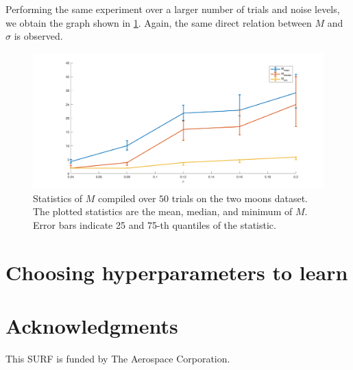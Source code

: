 \documentclass{siamart1116}
\begin{document}
        Performing the same experiment over a larger number of trials and noise levels, we obtain the graph shown in \cref{taM_M_moons_3}. Again, the same direct relation between $M$ and $\sigma$ is observed.

        \begin{figure}[!htb]
        \centering
        \caption{\label{taM_M_moons_3}Statistics of $M$ compiled over $50$ trials on the two moons dataset. The plotted statistics are the mean, median, and minimum of $M$. Error bars indicate 25 and 75-th quantiles of the statistic.}
        \includegraphics[width=0.8\linewidth]{M_observations/all_M_sigma.png}
        \end{figure}

\section{Choosing hyperparameters to learn}
    

\section{Acknowledgments}
    This SURF is funded by The Aerospace Corporation.



\end{document}
